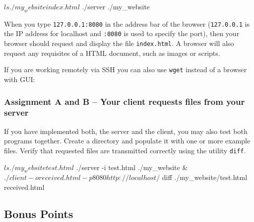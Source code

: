 \begin{osuefmtcode}
    $ ls ./my_website
    index.html
    $ ./server ./my_website
\end{osuefmtcode}

When you type \verb|127.0.0.1:8080| in the address bar of the browser
(\verb|127.0.0.1| is the IP address for localhost
and \verb|:8080| is used to specify the port),
then your browser should request and display the file \verb|index.html|.
A browser will also request any requisites of a HTML document,
such as images or scripts.

If you are working remotely via SSH
you can also use \verb|wget|
instead of a browser with GUI:


\subsubsection*{Assignment A and B -- Your client requests files from your server}

\vspace{-4mm}
If you have implemented both, the server and the client,
you may also test both programs together.
Create a directory and populate it with one or more example files.
Verify that requested files are transmitted correctly
using the utility \verb|diff|.

\begin{osuefmtcode}
    $ ls ./my_website
    test.html
    $ ./server -i test.html ./my_website &
    $ ./client -o received.html -p 8080 http://localhost/
    $ diff ./my_website/test.html received.html
\end{osuefmtcode}

\vspace{5mm}



\clearpage
\subsection*{Bonus Points}


